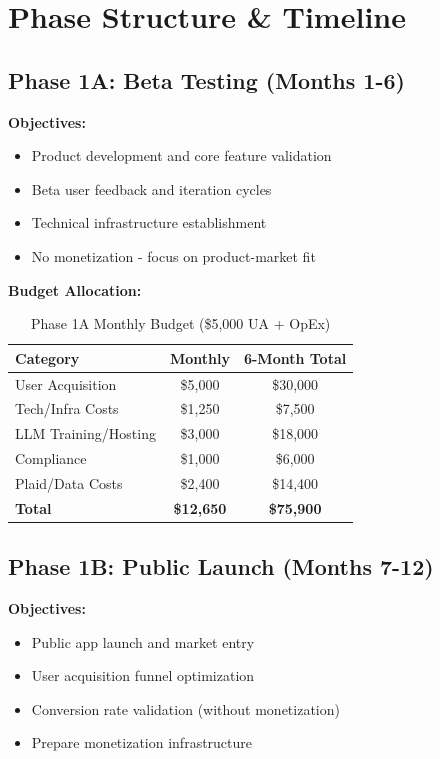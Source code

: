 \documentclass[11pt,letterpaper]{article}
\begin{document}
\newpage

\section{Phase Structure \& Timeline}

\subsection{Phase 1A: Beta Testing (Months 1-6)}

\textbf{Objectives:}
\begin{itemize}
\item Product development and core feature validation
\item Beta user feedback and iteration cycles
\item Technical infrastructure establishment
\item No monetization - focus on product-market fit
\end{itemize}

\textbf{Budget Allocation:}
\begin{table}[h]
\centering
\caption{Phase 1A Monthly Budget (\$5,000 UA + OpEx)}
\begin{tabular}{|l|c|c|}
\hline
\textbf{Category} & \textbf{Monthly} & \textbf{6-Month Total} \\
\hline
User Acquisition & \$5,000 & \$30,000 \\
Tech/Infra Costs & \$1,250 & \$7,500 \\
LLM Training/Hosting & \$3,000 & \$18,000 \\
Compliance & \$1,000 & \$6,000 \\
Plaid/Data Costs & \$2,400 & \$14,400 \\
\textbf{Total} & \textbf{\$12,650} & \textbf{\$75,900} \\
\hline
\end{tabular}
\end{table}

\subsection{Phase 1B: Public Launch (Months 7-12)}

\textbf{Objectives:}
\begin{itemize}
\item Public app launch and market entry
\item User acquisition funnel optimization
\item Conversion rate validation (without monetization)
\item Prepare monetization infrastructure
\end{itemize}
\end{document}
